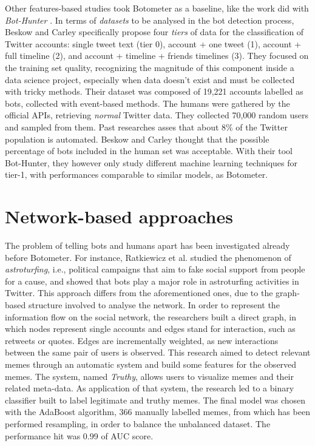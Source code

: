 Other features-based studies took Botometer as a baseline, like the work did with \textit{Bot-Hunter} \cite{Bot-Hunter}. In terms of \emph{datasets} to be analysed in the bot detection process, Beskow and Carley \cite{Bot-Hunter} specifically propose four \emph{tiers} of data for the classification of Twitter accounts: single tweet text (tier 0), account + one tweet (1), account + full timeline (2), and account + timeline + friends timelines (3). They focused on the training set quality, recognizing the magnitude of this component inside a data science project, especially when data doesn't exist and must be collected with tricky methods. Their dataset was composed of 19,221 accounts labelled as bots, collected with event-based methods. The humans were gathered by the official APIs, retrieving \textit{normal} Twitter data. They collected 70,000 random users and sampled from them. Past researches \cite{Varol} asses that about 8\% of the Twitter population is automated. Beskow and Carley thought that the possible percentage of bots included in the human set was acceptable. With their tool Bot-Hunter, they however only study different machine learning techniques for tier-1, with performances comparable to similar models, as Botometer.

\section{Network-based approaches}
The problem of telling bots and humans apart has been investigated already before Botometer. For instance, Ratkiewicz et al. \cite{Astroturfing} studied the phenomenon of \emph{astroturfing}, i.e., political campaigns that aim to fake social support from people for a cause, and showed that bots play a major role in astroturfing activities in Twitter. This approach differs from the aforementioned ones, due to the graph-based structure involved to analyse the network. In order to represent the information flow on the social network, the researchers built a direct graph, in which nodes represent single accounts and edges stand for interaction, such as retweets or quotes. Edges are incrementally weighted, as new interactions between the same pair of users is observed. This research aimed to detect relevant memes through an automatic system and build some features for the observed memes. The system, named \textit{Truthy}, allows users to visualize memes and their related meta-data. As application of that system, the research led to a binary classifier built to label legitimate and truthy memes. The final model was chosen with the AdaBoost algorithm, 366 manually labelled memes, from which has been performed resampling, in order to balance the unbalanced dataset. The performance hit was 0.99 of AUC score.

